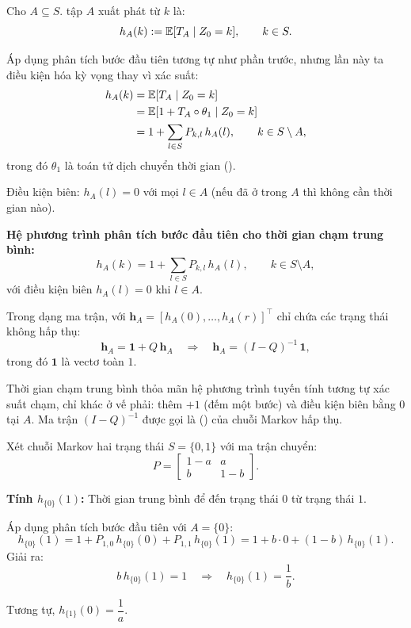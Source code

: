\begin{dinhnghia}
Cho $A \subseteq S$.  tập $A$ xuất phát từ $k$ là:
\[
  h_A(k) := \mathbb{E}[T_A \mid Z_0 = k], \qquad k \in S.
\]
\end{dinhnghia}

Áp dụng phân tích bước đầu tiên tương tự như phần trước, nhưng lần này ta điều kiện hóa
kỳ vọng thay vì xác suất:
\begin{align*}
  h_A(k) &= \mathbb{E}[T_A \mid Z_0 = k]\\
  &= \mathbb{E}[1 + T_A \circ \theta_1 \mid Z_0 = k]\\
  &= 1 + \sum_{l \in S} P_{k,l}\, h_A(l), \qquad k \in S \setminus A,
\end{align*}
trong đó $\theta_1$ là toán tử dịch chuyển thời gian ().

Điều kiện biên: $h_A(l) = 0$ với mọi $l \in A$ (nếu đã ở trong $A$ thì không cần thời gian nào).

\begin{congthuc}
\textbf{Hệ phương trình phân tích bước đầu tiên cho thời gian chạm trung bình:}
\[
  \boxed{
    h_A(k) = 1 + \sum_{l \in S} P_{k,l}\, h_A(l), \qquad k \in S \setminus A,
  }
\]
với điều kiện biên $h_A(l) = 0$ khi $l \in A$.
\end{congthuc}

Trong dạng ma trận, với $\mathbf{h}_A = [h_A(0), \ldots, h_A(r)]^\top$ chỉ chứa các trạng thái
không hấp thụ:
\begin{equation}\label{eq:mean-hitting-matrix}
  \mathbf{h}_A = \mathbf{1} + Q\, \mathbf{h}_A
  \quad\Longrightarrow\quad
  \boxed{
    \mathbf{h}_A = (I - Q)^{-1}\, \mathbf{1},
  }
\end{equation}
trong đó $\mathbf{1}$ là vectơ toàn $1$.

\begin{tomtat}
Thời gian chạm trung bình thỏa mãn hệ phương trình tuyến tính tương tự xác suất chạm,
chỉ khác ở vế phải: thêm $+1$ (đếm một bước) và điều kiện biên bằng $0$ tại $A$.
Ma trận $(I - Q)^{-1}$ được gọi là  () của chuỗi Markov hấp thụ.
\end{tomtat}

\begin{example}
\label{ex:two-state-hitting}
Xét chuỗi Markov hai trạng thái $S = \{0, 1\}$ với ma trận chuyển:
\[
  P = \begin{bmatrix} 1-a & a \\ b & 1-b \end{bmatrix}.
\]

\textbf{Tính $h_{\{0\}}(1)$:} Thời gian trung bình để đến trạng thái $0$ từ trạng thái $1$.

Áp dụng phân tích bước đầu tiên với $A = \{0\}$:
\[
  h_{\{0\}}(1) = 1 + P_{1,0}\, h_{\{0\}}(0) + P_{1,1}\, h_{\{0\}}(1)
  = 1 + b \cdot 0 + (1-b)\, h_{\{0\}}(1).
\]
Giải ra:
\[
  b\, h_{\{0\}}(1) = 1 \quad\Longrightarrow\quad h_{\{0\}}(1) = \frac{1}{b}.
\]

Tương tự, $h_{\{1\}}(0) = \dfrac{1}{a}$.
\end{example}

